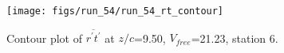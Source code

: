 \begin{figure}[H]
\centering
\texttt{[image: figs/run\_54/run\_54\_rt\_contour]}
\caption{Contour plot of $\overline{r^\prime t^\prime}$ at $z/c$=9.50, $V_{free}$=21.23, station 6.}
\end{figure}



